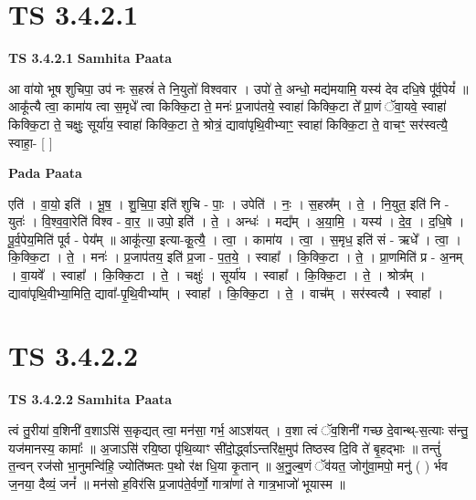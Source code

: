 \documentclass[17pt]{extarticle}
\begin{document}

\section{ TS 3.4.2.1 }

\textbf{TS 3.4.2.1 } \newline
\textbf{Samhita Paata} \newline

आ वा॑यो भूष शुचिपा॒ उप॑ नः स॒हस्रं॑ ते नि॒युतो॑ विश्ववार । उपो॑ ते॒ अन्धो॒ मद्य॑मयामि॒ यस्य॑ देव दधि॒षे पू᳚र्व॒पेयं᳚ ॥ आकू᳚त्यै त्वा॒ कामा॑य त्वा स॒मृधे᳚ त्वा किक्कि॒टा ते॒ मनः॑ प्र॒जाप॑तये॒ स्वाहा॑ किक्कि॒टा ते᳚ प्रा॒णं ॅवा॒यवे॒ स्वाहा॑ किक्कि॒टा ते॒ चक्षुः॒ सूर्या॑य॒ स्वाहा॑ किक्कि॒टा ते॒ श्रोत्रं॒ द्यावा॑पृथि॒वीभ्याꣳ॒॒ स्वाहा॑ किक्कि॒टा ते॒ वाचꣳ॒॒ सर॑स्वत्यै॒ स्वाहा॒- [  ] \newline

\textbf{Pada Paata} \newline

एति॑ । वा॒यो॒ इति॑ । भू॒ष॒ । शु॒चि॒पा॒ इति॑ शुचि - पाः॒ । उपेति॑ । नः॒ । स॒हस्र᳚म् । ते॒ । नि॒युत॒ इति॑ नि - युतः॑ । वि॒श्व॒वा॒रेति॑ विश्व - वा॒र॒ ॥ उपो॒ इति॑ । ते॒ । अन्धः॑ । मद्य᳚म् । अ॒या॒मि॒ । यस्य॑ । दे॒व॒ । द॒धि॒षे । पू॒र्व॒पेय॒मिति॑ पूर्व - पेय᳚म् ॥ आकू᳚त्या॒ इत्या-कू॒त्यै॒ । त्वा॒ । कामा॑य । त्वा॒ । स॒मृध॒ इति॑ सं - ऋधे᳚ । त्वा॒ । कि॒क्कि॒टा । ते॒ । मनः॑ । प्र॒जाप॑तय॒ इति॑ प्र॒जा - प॒त॒ये॒ । स्वाहा᳚ । कि॒क्कि॒टा । ते॒ । प्रा॒णमिति॑ प्र - अ॒नम् । वा॒यवे᳚ । स्वाहा᳚ । कि॒क्कि॒टा । ते॒ । चक्षुः॑ । सूर्या॑य । स्वाहा᳚ । कि॒क्कि॒टा । ते॒ । श्रोत्र᳚म् । द्यावा॑पृथि॒वीभ्या॒मिति॒ द्यावा᳚-पृ॒थि॒वीभ्या᳚म् । स्वाहा᳚ । कि॒क्कि॒टा । ते॒ । वाच᳚म् । सर॑स्वत्यै । स्वाहा᳚ ।  \newline





\section{ TS 3.4.2.2 }

\textbf{TS 3.4.2.2 } \newline
\textbf{Samhita Paata} \newline

त्वं तु॒रीया॑ व॒शिनी॑ व॒शाऽसि॑ स॒कृद्यत् त्वा॒ मन॑सा॒ गर्भ॒ आऽश॑यत् । व॒शा त्वं ॅव॒शिनी॑ गच्छ दे॒वान्थ्-स॒त्याः स॑न्तु॒ यज॑मानस्य॒ कामाः᳚ ॥ अ॒जाऽसि॑ रयि॒ष्ठा पृ॑थि॒व्याꣳ सी॑दो॒र्द्ध्वाऽन्तरि॑क्ष॒मुप॑ तिष्ठस्व दि॒वि ते॑ बृ॒हद्भाः ॥ तन्तुं॑ त॒न्वन् रज॑सो भा॒नुमन्वि॑हि॒ ज्योति॑ष्मतः प॒थो र॑क्ष धि॒या कृ॒तान् ॥ अ॒नु॒ल्ब॒णं ॅव॑यत॒ जोगु॑वा॒मपो॒ मनु॑ ( ) र्भव ज॒नया॒ दैव्यं॒ जनं᳚ ॥ मन॑सो ह॒विर॑सि प्र॒जाप॑ते॒र्वर्णो॒ गात्रा॑णां ते गात्र॒भाजो॑ भूयास्म ॥ \newline
\end{document}
